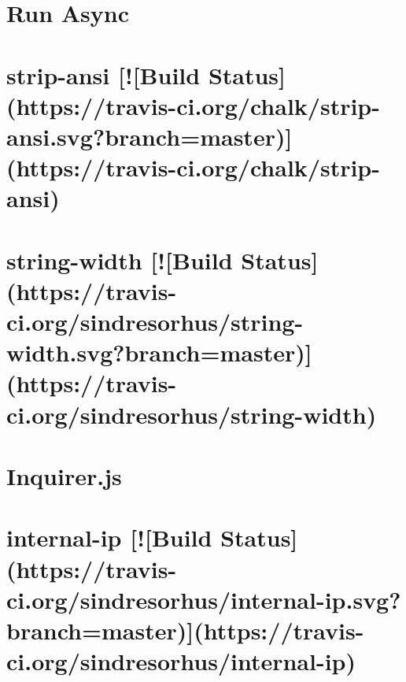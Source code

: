 \documentclass[twoside]{book}
\newcommand{\+}{\discretionary{\mbox{\scriptsize$\hookleftarrow$}}{}{}}
\begin{document}
\chapter{Run Async}
\label{md__c_1_workspace_demo_src_main_script_node_modules_inquirer_node_modules_run-async__r_e_a_d_m_e}

\chapter{strip-\/ansi \mbox{[}!\mbox{[}Build Status\mbox{]}(https\+://travis-\/ci.org/chalk/strip-\/ansi.svg?branch=master)\mbox{]}(https\+://travis-\/ci.org/chalk/strip-\/ansi)}
\label{md__c_1_workspace_demo_src_main_script_node_modules_inquirer_node_modules_string-width_node_modules_strip-ansi_readme}

\chapter{string-\/width \mbox{[}!\mbox{[}Build Status\mbox{]}(https\+://travis-\/ci.org/sindresorhus/string-\/width.svg?branch=master)\mbox{]}(https\+://travis-\/ci.org/sindresorhus/string-\/width)}
\label{md__c_1_workspace_demo_src_main_script_node_modules_inquirer_node_modules_string-width_readme}

\chapter{Inquirer.\+js}
\label{md__c_1_workspace_demo_src_main_script_node_modules_inquirer__r_e_a_d_m_e}

\chapter{internal-\/ip \mbox{[}!\mbox{[}Build Status\mbox{]}(https\+://travis-\/ci.org/sindresorhus/internal-\/ip.svg?branch=master)\mbox{]}(https\+://travis-\/ci.org/sindresorhus/internal-\/ip)}
\label{md__c_1_workspace_demo_src_main_script_node_modules_internal-ip_readme}

\end{document}
